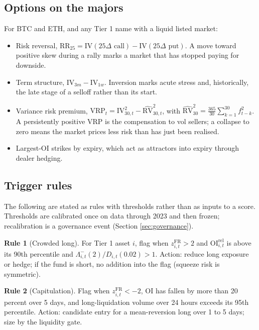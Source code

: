 \documentclass[11pt,a4paper]{article}
\theoremstyle{definition}
\newtheorem{rule_}{Rule}[section]
\begin{document}
\subsection{Options on the majors}

For BTC and ETH, and any Tier 1 name with a liquid listed market:
\begin{itemize}[nosep]
\item Risk reversal, $\mathrm{RR}_{25} = \mathrm{IV}(25\Delta\text{ call}) - \mathrm{IV}(25\Delta\text{ put})$. A move toward positive skew during a rally marks a market that has stopped paying for downside.
\item Term structure, $\mathrm{IV}_{3m} - \mathrm{IV}_{1w}$. Inversion marks acute stress and, historically, the late stage of a selloff rather than its start.
\item Variance risk premium, $\mathrm{VRP}_t = \mathrm{IV}^2_{30,t} - \widehat{\mathrm{RV}}^2_{30,t}$, with $\widehat{\mathrm{RV}}^2_{30} = \tfrac{365}{30}\sum_{k=1}^{30} f_{t-k}^2$. A persistently positive VRP is the compensation to vol sellers; a collapse to zero means the market prices less risk than has just been realised.
\item Largest-OI strikes by expiry, which act as attractors into expiry through dealer hedging.
\end{itemize}

\subsection{Trigger rules}

The following are stated as rules with thresholds rather than as inputs to a score. Thresholds are calibrated once on data through 2023 and then frozen; recalibration is a governance event (Section \ref{sec:governance}).

\begin{rule_}[Crowded long]\label{rule:crowded}
For Tier 1 asset $i$, flag when $z^{\mathrm{FR}}_{i,t} > 2$ and $\mathrm{OI}^{\mathrm{rel}}_{i,t}$ is above its 90th percentile and $\Lambda^{-}_{i,t}(2) / D_{i,t}(0.02) > 1$. Action: reduce long exposure or hedge; if the fund is short, no addition into the flag (squeeze risk is symmetric).
\end{rule_}

\begin{rule_}[Capitulation]
Flag when $z^{\mathrm{FR}}_{i,t} < -2$, OI has fallen by more than 20 percent over 5 days, and long-liquidation volume over 24 hours exceeds its 95th percentile. Action: candidate entry for a mean-reversion long over 1 to 5 days; size by the liquidity gate.
\end{rule_}
\end{document}
